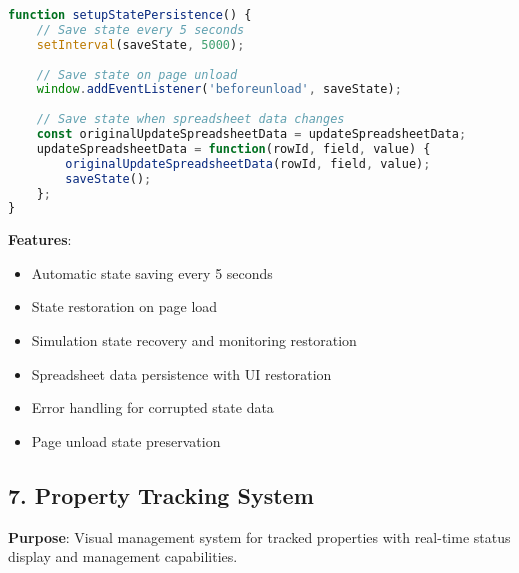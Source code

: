 \documentclass[12pt,a4paper]{article}
\begin{document}
\begin{lstlisting}[language=JavaScript, caption=State Persistence Implementation]
function setupStatePersistence() {
    // Save state every 5 seconds
    setInterval(saveState, 5000);
    
    // Save state on page unload
    window.addEventListener('beforeunload', saveState);
    
    // Save state when spreadsheet data changes
    const originalUpdateSpreadsheetData = updateSpreadsheetData;
    updateSpreadsheetData = function(rowId, field, value) {
        originalUpdateSpreadsheetData(rowId, field, value);
        saveState();
    };
}
\end{lstlisting}

\textbf{Features}:
\begin{itemize}
    \item Automatic state saving every 5 seconds
    \item State restoration on page load
    \item Simulation state recovery and monitoring restoration
    \item Spreadsheet data persistence with UI restoration
    \item Error handling for corrupted state data
    \item Page unload state preservation
\end{itemize}

\subsection{7. Property Tracking System}

\textbf{Purpose}: Visual management system for tracked properties with real-time status display and management capabilities.
\end{document}
